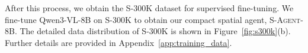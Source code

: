After this process, we obtain the \textsc{S-300K} dataset for supervised fine-tuning. 
We fine-tune Qwen3-VL-8B on \textsc{S-300K} to obtain our compact spatial agent, \textsc{S-Agent-8B}. 
The detailed data distribution of \textsc{S-300K} is shown in Figure~\ref{fig:s300k}(b).
Further details are provided in Appendix~\ref{app:training_data}.






